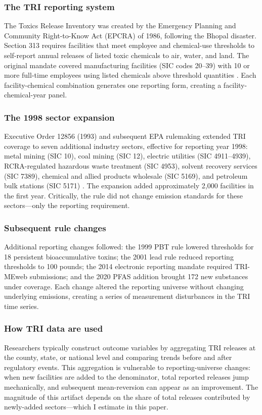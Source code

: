 \documentclass[12pt]{article}
\begin{document}
\subsubsection*{The TRI reporting system} The Toxics Release Inventory was created by the Emergency Planning and Community Right-to-Know Act (EPCRA) of 1986, following the Bhopal disaster. Section 313 requires facilities that meet employee and chemical-use thresholds to self-report annual releases of listed toxic chemicals to air, water, and land. The original mandate covered manufacturing facilities (SIC codes 20--39) with 10 or more full-time employees using listed chemicals above threshold quantities \citep{epa2020tri}. Each facility-chemical combination generates one reporting form, creating a facility-chemical-year panel.

\subsubsection*{The 1998 sector expansion} Executive Order 12856 (1993) and subsequent EPA rulemaking extended TRI coverage to seven additional industry sectors, effective for reporting year 1998: metal mining (SIC 10), coal mining (SIC 12), electric utilities (SIC 4911--4939), RCRA-regulated hazardous waste treatment (SIC 4953), solvent recovery services (SIC 7389), chemical and allied products wholesale (SIC 5169), and petroleum bulk stations (SIC 5171) \citep{epa1997addition}. The expansion added approximately 2,000 facilities in the first year. Critically, the rule did not change emission standards for these sectors---only the reporting requirement.

\subsubsection*{Subsequent rule changes} Additional reporting changes followed: the 1999 PBT rule lowered thresholds for 18 persistent bioaccumulative toxins; the 2001 lead rule reduced reporting thresholds to 100 pounds; the 2014 electronic reporting mandate required TRI-MEweb submissions; and the 2020 PFAS addition brought 172 new substances under coverage. Each change altered the reporting universe without changing underlying emissions, creating a series of measurement disturbances in the TRI time series.

\subsubsection*{How TRI data are used} Researchers typically construct outcome variables by aggregating TRI releases at the county, state, or national level and comparing trends before and after regulatory events. This aggregation is vulnerable to reporting-universe changes: when new facilities are added to the denominator, total reported releases jump mechanically, and subsequent mean-reversion can appear as an improvement. The magnitude of this artifact depends on the share of total releases contributed by newly-added sectors---which I estimate in this paper.
\end{document}
